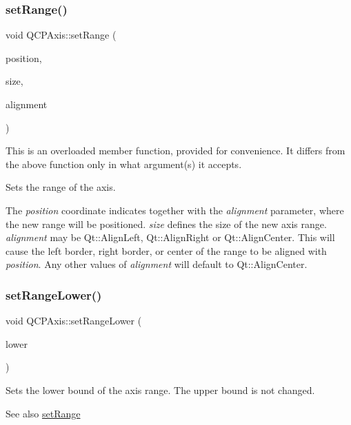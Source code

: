 \subsubsection{\texorpdfstring{set\+Range()}{setRange()}\hspace{0.1cm}{\footnotesize\ttfamily [3/3]}}
{\footnotesize\ttfamily void Q\+C\+P\+Axis\+::set\+Range (\begin{DoxyParamCaption}\item[{double}]{position,  }\item[{double}]{size,  }\item[{Qt\+::\+Alignment\+Flag}]{alignment }\end{DoxyParamCaption})}

This is an overloaded member function, provided for convenience. It differs from the above function only in what argument(s) it accepts.

Sets the range of the axis.

The {\itshape position} coordinate indicates together with the {\itshape alignment} parameter, where the new range will be positioned. {\itshape size} defines the size of the new axis range. {\itshape alignment} may be Qt\+::\+Align\+Left, Qt\+::\+Align\+Right or Qt\+::\+Align\+Center. This will cause the left border, right border, or center of the range to be aligned with {\itshape position}. Any other values of {\itshape alignment} will default to Qt\+::\+Align\+Center. \mbox{\label{class_q_c_p_axis_afcf51227d337db28d1a9ce9a4d1bc91a}} 
\subsubsection{\texorpdfstring{set\+Range\+Lower()}{setRangeLower()}}
{\footnotesize\ttfamily void Q\+C\+P\+Axis\+::set\+Range\+Lower (\begin{DoxyParamCaption}\item[{double}]{lower }\end{DoxyParamCaption})}

Sets the lower bound of the axis range. The upper bound is not changed. \begin{DoxySeeAlso}{See also}
\hyperlink{class_q_c_p_axis_aebdfea5d44c3a0ad2b4700cd4d25b641}{set\+Range} 
\end{DoxySeeAlso}
\mbox{\label{class_q_c_p_axis_a2172fdb196b1a0dc3f40992fcad8e9e1}} 

